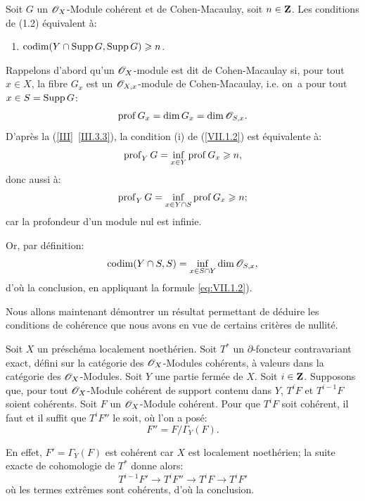 \begin{corollaire}\label{VII.1.4}
Soit $G$ un $\mathscr{O}_X$-Module coh\'erent et de Cohen-Macaulay, soit $n \in \mathbf{Z}$. Les conditions de \textup{(1.2)} \'equivalent \`a:
\begin{enumerate}
\item[\textup{(v)}]\hfill$\operatorname{codim}(Y \cap \operatorname{Supp} G, \operatorname{Supp} G) \geqslant n$.\hfill\null
\end{enumerate}
\end{corollaire}
\setcounter{equation}{1}
Rappelons d'abord qu'un $\mathscr{O}_X$-module est dit de Cohen-Macaulay si, pour tout $x \in X$, la fibre $G_x$ est un ${\mathscr O}_{X, x}$-module de Cohen-Macaulay, i.e. on~a pour tout $x \in S = \operatorname{Supp} G$:
\begin{equation}\label{eq:VII.1.2}
\operatorname{prof} G_x = \dim G_x = \dim {\mathscr O}_{S, x}.
\end{equation}
D'apr\`es la (\ref{III}~\ref{III.3.3}), la condition (i) de (\ref{VII.1.2}) est \'equivalente \`a:
\begin{equation}\label{eq:VII.1.3} \operatorname{prof}_Y G = \inf_{x\in Y} \operatorname{prof} G_x \geqslant n,
\end{equation}
donc aussi \`a:
\[
\operatorname{prof}_Y G = \inf_{x \in Y \cap S} \operatorname{prof} G_x \geqslant n;
\]
car la profondeur d'un module nul est infinie.

Or, par d\'efinition:
\[
\operatorname{codim} (Y \cap S, S) = \inf_{x \in S \cap Y} \dim {\mathscr O}_{S, x},
\]
d'o\`u la conclusion, en appliquant la formule \eqref{eq:VII.1.2}).

Nous allons maintenant d\'emontrer un r\'esultat permettant de d\'eduire les conditions de coh\'erence que nous avons en vue de certains crit\`eres de nullit\'e.

\begin{lemme}\label{VII.1.5}
Soit $X$ un pr\'esch\'ema localement noeth\'erien. Soit $T^{\ast}$ un $\partial$-foncteur contravariant exact, d\'efini sur la cat\'egorie des $\mathscr{O}_X$-Modules coh\'erents, \`a valeurs dans la cat\'egorie des $\mathscr{O}_X$-Modules. Soit $Y$ une partie ferm\'ee de $X$. Soit $i \in \mathbf{Z}$. Supposons que, pour tout $\mathscr{O}_X$-Module coh\'erent de support contenu dans $Y$, $T^i F$ et $T^{i-1} F$ soient coh\'erents. Soit $F$ un $\mathscr{O}_X$-Module coh\'erent. Pour que $T^i F$ soit coh\'erent, il faut et il suffit que $T^i F''$ le soit, o\`u l'on a pos\'e:
\[
F'' = F / \Gamma_Y (F).
\]
\end{lemme}

En effet, $F' = \Gamma_Y (F)$ est coh\'erent car $X$ est localement noeth\'erien; la suite exacte de cohomologie de $T^{\ast}$ donne alors:
\[
T^{i-1}F' \to T^i F'' \to T^i F \to T^i F'
\]
o\`u les termes extr\^emes sont coh\'erents, d'o\`u la conclusion.

